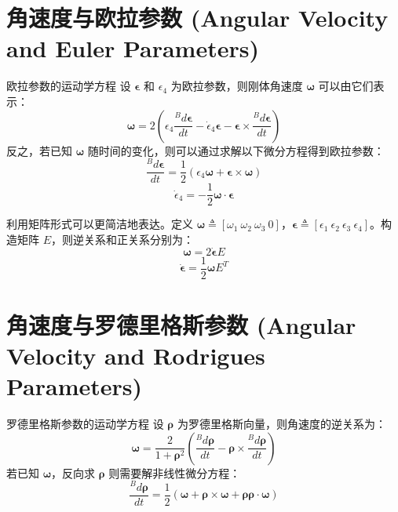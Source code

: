 \section{角速度与欧拉参数 (Angular Velocity and Euler Parameters)}

\begin{myTheorem}{欧拉参数的运动学方程}
设 \(\boldsymbol{\epsilon}\) 和 \(\epsilon_4\) 为欧拉参数，则刚体角速度 \(\boldsymbol{\omega}\) 可以由它们表示：
\begin{equation}
\boldsymbol{\omega} = 2\left( \epsilon_4 \frac{{}^B d\boldsymbol{\epsilon}}{dt} - \dot{\epsilon}_4 \boldsymbol{\epsilon} - \boldsymbol{\epsilon} \times \frac{{}^B d\boldsymbol{\epsilon}}{dt} \right) \tag{1}
\end{equation}
反之，若已知 \(\boldsymbol{\omega}\) 随时间的变化，则可以通过求解以下微分方程得到欧拉参数：
\begin{equation}
\frac{{}^B d\boldsymbol{\epsilon}}{dt} = \frac{1}{2} (\epsilon_4 \boldsymbol{\omega} + \boldsymbol{\epsilon} \times \boldsymbol{\omega}) \tag{2}
\end{equation}
\begin{equation}
\dot{\epsilon}_4 = -\frac{1}{2} \boldsymbol{\omega} \cdot \boldsymbol{\epsilon} \tag{3}
\end{equation}
\end{myTheorem}

利用矩阵形式可以更简洁地表达。定义 \(\boldsymbol{\omega} \triangleq [\omega_1\ \omega_2\ \omega_3\ 0]\)，\(\boldsymbol{\epsilon} \triangleq [\epsilon_1\ \epsilon_2\ \epsilon_3\ \epsilon_4]\)。构造矩阵 \(E\)，则逆关系和正关系分别为：
\begin{equation}
\boldsymbol{\omega} = 2\dot{\boldsymbol{\epsilon}} E \tag{7}
\end{equation}
\begin{equation}
\dot{\boldsymbol{\epsilon}} = \frac{1}{2} \boldsymbol{\omega} E^T \tag{8}
\end{equation}

\section{角速度与罗德里格斯参数 (Angular Velocity and Rodrigues Parameters)}

\begin{myTheorem}{罗德里格斯参数的运动学方程}
设 \(\boldsymbol{\rho}\) 为罗德里格斯向量，则角速度的逆关系为：
\begin{equation}
\boldsymbol{\omega} = \frac{2}{1 + \boldsymbol{\rho}^2} \left( \frac{{}^B d\boldsymbol{\rho}}{dt} - \boldsymbol{\rho} \times \frac{{}^B d\boldsymbol{\rho}}{dt} \right) \tag{1}
\end{equation}
若已知 \(\boldsymbol{\omega}\)，反向求 \(\boldsymbol{\rho}\) 则需要解非线性微分方程：
\begin{equation}
\frac{{}^B d\boldsymbol{\rho}}{dt} = \frac{1}{2} (\boldsymbol{\omega} + \boldsymbol{\rho} \times \boldsymbol{\omega} + \boldsymbol{\rho} \boldsymbol{\rho} \cdot \boldsymbol{\omega}) \tag{2}
\end{equation}
\end{myTheorem}

